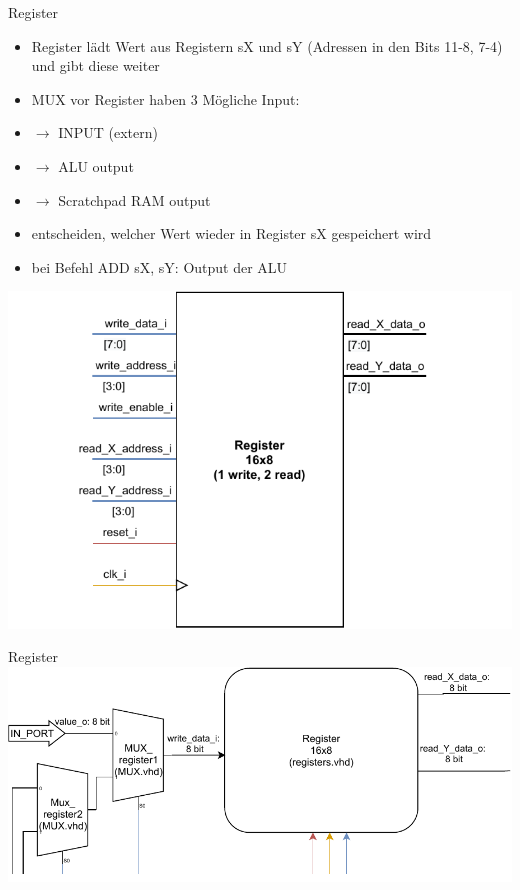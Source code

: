 \documentclass[10pt, t,
aspectratio=169,%
usenames,
dvipsnames,
]{beamer}
\begin{document}
	\begin{frame}{Register}
		\begin{multicols}{2}
		\begin{itemize}
			\item Register lädt Wert aus Registern sX und sY (Adressen in den Bits 11-8, 7-4) und gibt diese weiter
			\item MUX vor Register haben 3 Mögliche Input:
			\item $\rightarrow$ INPUT (extern)
			\item $\rightarrow$ ALU output
			\item $\rightarrow$ Scratchpad RAM output
			\item entscheiden, welcher Wert wieder in Register sX gespeichert wird
			\item bei Befehl ADD sX, sY: Output der ALU
		\end{itemize}
		\includegraphics[width=\linewidth]{../Blockbeschreibungen/Register_beschreibung.pdf}
		\end{multicols}
	\end{frame}

	\begin{frame}{Register}
		\includegraphics[width=\linewidth]{../Blockbeschreibungen/Ram-BlockdiagramSnipits.pdf}
	\end{frame}
	
\end{document}
